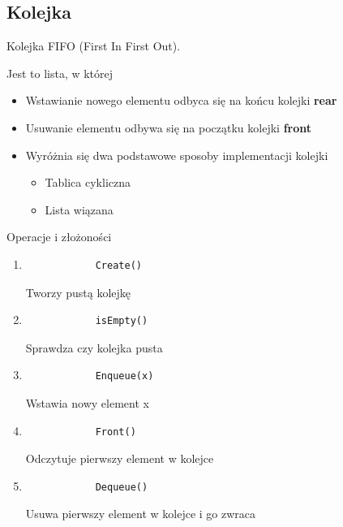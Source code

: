 \documentclass[12pt]{article}
\begin{document}
    \subsection{Kolejka}
    \begin{definition}
        Kolejka FIFO (First In First Out).

        Jest to lista, w której
        \begin{itemize}
            \item Wstawianie nowego elementu odbyca się na końcu kolejki \textbf{rear}
            \item Usuwanie elementu odbywa się na początku kolejki \textbf{front}\\
            \item Wyróżnia się dwa podstawowe sposoby implementacji kolejki
            \begin{itemize}
                \item Tablica cykliczna
                \item Lista wiązana
            \end{itemize}
        \end{itemize}
    \end{definition}

    Operacje i złożoności
    \begin{enumerate}
        \item
        \begin{verbatim}
            Create()
        \end{verbatim}
        Tworzy pustą kolejkę
        \item
        \begin{verbatim}
            isEmpty()
        \end{verbatim}
        Sprawdza czy kolejka pusta
        \item
        \begin{verbatim}
            Enqueue(x)
        \end{verbatim}
        Wstawia nowy element x
        \item
        \begin{verbatim}
            Front()
        \end{verbatim}
        Odczytuje pierwszy element w kolejce
        \item
        \begin{verbatim}
            Dequeue()
        \end{verbatim}
        Usuwa pierwszy element w kolejce i go zwraca
    \end{enumerate}
\end{document}
